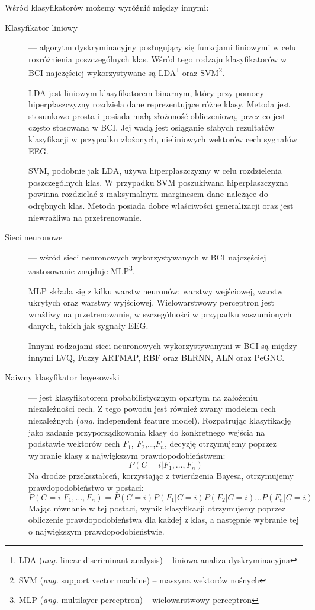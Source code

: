 \documentclass[skorowidz,skroty]{dyplomWEZUT}
\begin{document}
Wśród klasyfikatorów możemy wyróżnić między innymi:
\begin{description}
    \item [Klasyfikator liniowy] --- algorytm dyskryminacyjny posługujący się funkcjami liniowymi w celu rozróżnienia poszczególnych klas\cite{eeg_classification}. Wśród tego rodzaju klasyfikatorów w BCI najczęściej wykorzystywane są LDA\footnote{LDA (\textit{ang.} linear discriminant analysis) -- liniowa analiza dyskryminacyjna} oraz SVM\footnote{SVM (\textit{ang.} support vector machine) -- maszyna wektorów nośnych}\cite{bci_trends}.
    
    LDA jest liniowym klasyfikatorem binarnym, który przy pomocy hiperpłaszczyzny rozdziela dane reprezentujące różne klasy\cite{eeg_classification}. Metoda jest stosunkowo prosta i posiada małą złożoność obliczeniową, przez co jest często stosowana w BCI. Jej wadą jest osiąganie słabych rezultatów klasyfikacji w przypadku złożonych, nieliniowych wektorów cech sygnałów EEG\cite{bci_trends}. 

    SVM, podobnie jak LDA, używa hiperpłaszczyzny w celu rozdzielenia poszczególnych klas. W przypadku SVM poszukiwana hiperpłaszczyzna powinna rozdzielać z maksymalnym marginesem dane należące do odrębnych klas. Metoda posiada dobre właściwości generalizacji oraz jest niewrażliwa na przetrenowanie\cite{eeg_features}.

    \item [Sieci neuronowe] --- wśród sieci neuronowych wykorzystywanych w BCI najczęściej zastosowanie znajduje MLP\footnote{MLP (\textit{ang.} multilayer perceptron) -- wielowarstwowy perceptron}\cite{eeg_classification}.
    
    MLP składa się z kilku warstw neuronów: warstwy wejściowej, warstw ukrytych oraz warstwy wyjściowej. Wielowarstwowy perceptron jest wrażliwy na przetrenowanie, w szczególności w przypadku zaszumionych danych, takich jak sygnały EEG\cite{bci_trends}.

    Innymi rodzajami sieci neuronowych wykorzystywanymi w BCI są między innymi LVQ, Fuzzy ARTMAP, RBF oraz BLRNN, ALN oraz PeGNC\cite{eeg_classification}.
    
    \item [Naiwny klasyfikator bayesowski] --- jest klasyfikatorem probabilistycznym opartym na założeniu niezależności cech. Z tego powodu jest również zwany modelem cech niezależnych (\textit{ang.} independent feature model). Rozpatrując klasyfikację jako zadanie przyporządkowania klasy do konkretnego wejścia na podstawie wektorów cech $F_1$, $F_2$,\dots,$F_n$, decyzję otrzymujemy poprzez wybranie klasy z największym prawdopodobieństwem:
    $$P(C=i|F_1, \dots ,F_n)$$
    Na drodze przekształceń, korzystając z twierdzenia Bayesa, otrzymujemy prawdopodobieństwo w postaci:
    $$P(C=i|F_1, \dots ,F_n) = P(C=i)P(F_1|C=i)P(F_2|C=i) \dots P(F_n|C=i)$$
    Mając równanie w tej postaci, wynik klasyfikacji otrzymujemy poprzez obliczenie prawdopodobieństwa dla każdej z klas, a następnie wybranie tej o największym prawdopodobieństwie\cite{bci_introduction}.    


\end{description}
\end{document}
